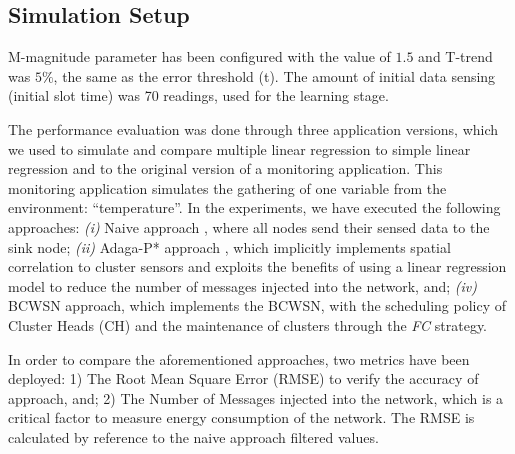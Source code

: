 \documentclass{acm_proc_article-sp}
\begin{document}
\subsection{Simulation Setup}
\label{data-and-experiments}

M-magnitude parameter has been configured with the value of $1.5$ and T-trend
was $5\%$, the same as the error threshold (t). The amount of initial data sensing
(initial slot time) was 70 readings, used for the learning stage.

The performance evaluation was done through three application versions, which we
used to simulate and compare multiple linear regression to simple linear
regression and to the original version of a monitoring application. This
monitoring application simulates the gathering of one variable from the
environment: ``temperature''.
In the experiments, we have executed the following approaches: {\it
  (i)} Naive approach \cite{Madden2005}, where all nodes send their sensed
data to the sink node;  {\it
  (ii)} Adaga-P* approach \cite{MaiaACR2013} \cite{MaiaSAC2013}, which
implicitly implements spatial correlation to cluster sensors and exploits the
benefits of using a linear regression model to reduce the number of messages
injected into the network, and;  {\it 
  (iv)} BCWSN approach, which implements the BCWSN, with the scheduling
policy of Cluster Heads (CH) and the maintenance of clusters through the
\textit{FC} strategy.

In order to compare the aforementioned approaches, two metrics have been
deployed: 1) The Root Mean Square Error (RMSE) to verify the accuracy of
approach, and; 2) The Number of Messages injected into the network, which is a
critical factor to measure energy consumption of the network. The RMSE is
calculated by reference to the naive approach filtered values.

\end{document}
